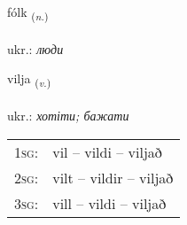 \documentclass[frontgrid, backgrid]{flacards}\usepackage[]{graphicx}\usepackage[]{xcolor}
\begin{document}
{fólk \small{\textsubscript{(\textit{n.})}} \\[1ex] %
\textphonetic{[foul̥k]} \\
ukr.: \emph{люди} \\  [2ex]
\renewcommand*{\arraystretch}{0.8}
}

\renewcommand{\flhead}{\vskip5pt \fboxsep=0pt {\small\bfseries\footnotesize Sagnorð | дієслово}}
\renewcommand{\fcfoot}{\vskip5pt \fboxsep=0pt \hspace{2pt}{\small\bfseries\footnotesize 1K}}

\renewcommand{\blhead}{\vskip5pt {\small\bfseries\footnotesize Sagnorð | дієслово }}
\renewcommand{\bcfoot}{\vskip5pt \hspace{2pt}{\small\bfseries\footnotesize 1K}}


{vilja \small{\textsubscript{(\textit{v.})}} \\[1ex] %
\textphonetic{[vɪlja]} \\
ukr.: \emph{хотіти; бажати} \\  [2ex]
\renewcommand*{\arraystretch}{0.8}
\begin{tabular}{p{1cm}l}
\textsc{1sg}: & vil -- vildi -- viljað \\ 
\textsc{2sg}: & vilt -- vildir -- viljað \\ 
\textsc{3sg}: & vill -- vildi -- viljað \\ 
\end{tabular}
}

\renewcommand{\flhead}{\vskip5pt \fboxsep=0pt {\small\bfseries\footnotesize Lýsingarorð | прикметник}}
\renewcommand{\fcfoot}{\vskip5pt \fboxsep=0pt \hspace{2pt}{\small\bfseries\footnotesize 1K}}

\renewcommand{\blhead}{\vskip5pt {\small\bfseries\footnotesize Lýsingarorð | прикметник }}
\renewcommand{\bcfoot}{\vskip5pt \hspace{2pt}{\small\bfseries\footnotesize 1K}}
\end{document}
